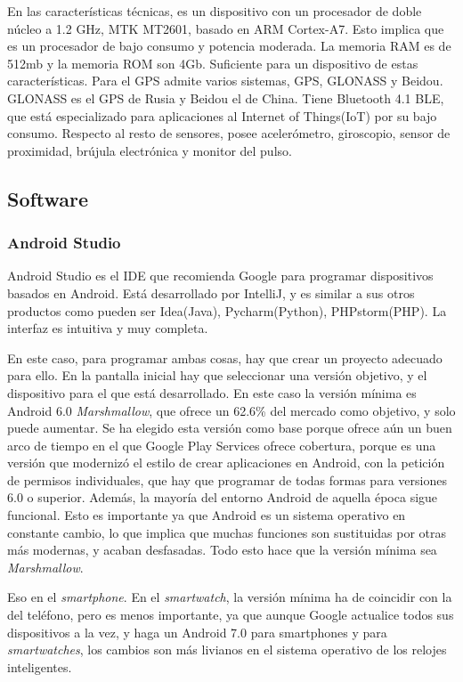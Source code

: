 \documentclass[12pt]{article}
\numberwithin{equation}{section}
\begin{document}
{En las características técnicas, es un dispositivo con un procesador de doble núcleo a 1.2 GHz, MTK MT2601, basado en ARM Cortex-A7. Esto implica que es un procesador de bajo consumo y potencia moderada. La memoria RAM es de 512mb y la memoria ROM son 4Gb. Suficiente para un dispositivo de estas características. Para el GPS admite varios sistemas, GPS, GLONASS y Beidou. GLONASS es el GPS de Rusia y Beidou el de China. Tiene Bluetooth 4.1 BLE, que está especializado para aplicaciones al Internet of Things(IoT) por su bajo consumo. Respecto al resto de sensores, posee acelerómetro, giroscopio, sensor de proximidad, brújula electrónica y monitor del pulso.

\subsection{Software}

\subsubsection{Android Studio}

Android Studio es el IDE que recomienda Google para programar dispositivos basados en Android. Está desarrollado por IntelliJ, y es similar a sus otros productos como pueden ser Idea(Java), Pycharm(Python), PHPstorm(PHP). La interfaz es intuitiva y muy completa.

En este caso, para programar ambas cosas, hay que crear un proyecto adecuado para ello. En la pantalla inicial hay que seleccionar una versión objetivo, y el dispositivo para el que está desarrollado. En este caso la versión mínima es Android 6.0 \textit{Marshmallow}, que ofrece un 62.6\% del mercado como objetivo, y solo puede aumentar. Se ha elegido esta versión como base porque ofrece aún un buen arco de tiempo en el que Google Play Services ofrece cobertura, porque es una versión que modernizó el estilo de crear aplicaciones en Android, con la petición de permisos individuales, que hay que programar de todas formas para versiones 6.0 o superior. Además, la mayoría del entorno Android de aquella época sigue funcional. Esto es importante ya que Android es un sistema operativo en constante cambio, lo que implica que muchas funciones son sustituidas por otras más modernas, y acaban desfasadas. Todo esto hace que la versión mínima sea \textit{Marshmallow}.

Eso en el \textit{smartphone}. En el \textit{smartwatch}, la versión mínima ha de coincidir con la del teléfono, pero es menos importante, ya que aunque Google actualice todos sus dispositivos a la vez, y haga un Android 7.0 para smartphones y para \textit{smartwatches}, los cambios son más livianos en el sistema operativo de los relojes inteligentes.


}
\end{document}
